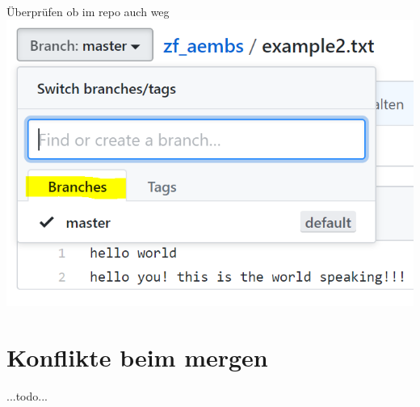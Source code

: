 \documentclass[a4paper, 8pt]{extarticle}
\begin{document}
\begin{multicols*}{3}
\begin{enumerate}
                            Überprüfen ob im repo auch weg\\
                                \includegraphics[width=1\linewidth, left]{img/git_delete_branch_remotePNG_repo}\\
                 \end{enumerate}

            \section{Konflikte beim mergen}
                ...todo... 

\end{multicols*}
\end{document}
